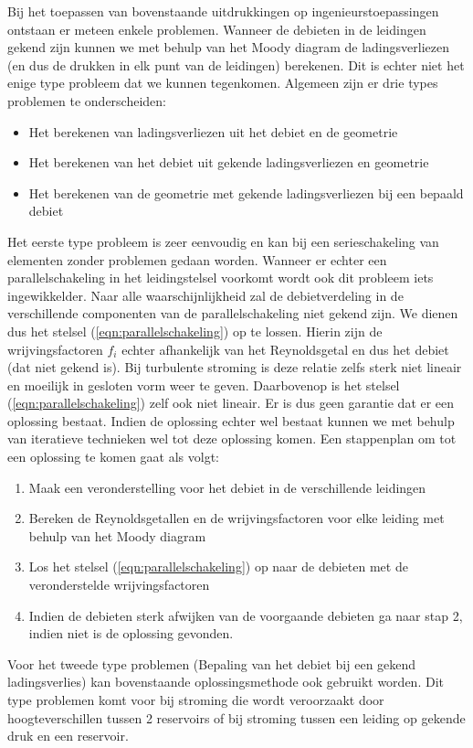 Bij het toepassen van bovenstaande uitdrukkingen op ingenieurstoepassingen ontstaan er meteen enkele problemen. Wanneer de debieten in de leidingen gekend zijn kunnen we met behulp van het Moody diagram de ladingsverliezen (en dus de drukken in elk punt van de leidingen) berekenen. Dit is echter niet het enige type probleem dat we kunnen tegenkomen. Algemeen zijn er drie types problemen te onderscheiden:
\begin{itemize}
	\item Het berekenen van ladingsverliezen uit het debiet en de geometrie
	\item Het berekenen van het debiet uit gekende ladingsverliezen en geometrie
	\item Het berekenen van de geometrie met gekende ladingsverliezen bij een bepaald debiet
\end{itemize}
Het eerste type probleem is zeer eenvoudig en kan bij een serieschakeling van elementen zonder problemen gedaan worden. Wanneer er echter een parallelschakeling in het leidingstelsel voorkomt wordt ook dit probleem iets ingewikkelder. Naar alle waarschijnlijkheid zal de debietverdeling in de verschillende componenten van de parallelschakeling niet gekend zijn. We dienen dus het stelsel (\ref{eqn:parallelschakeling}) op te lossen. Hierin zijn de wrijvingsfactoren $f_i$ echter afhankelijk van het Reynoldsgetal en dus het debiet (dat niet gekend is). Bij turbulente stroming is deze relatie zelfs sterk niet lineair en moeilijk in gesloten vorm weer te geven. Daarbovenop is het stelsel (\ref{eqn:parallelschakeling}) zelf ook niet lineair. Er is dus geen garantie dat er een oplossing bestaat.
Indien de oplossing echter wel bestaat kunnen we met behulp van iteratieve technieken wel tot deze oplossing komen. Een stappenplan om tot een oplossing te komen gaat als volgt:
\begin{enumerate}
	\item Maak een veronderstelling voor het debiet in de verschillende leidingen
	\item Bereken de Reynoldsgetallen en de wrijvingsfactoren voor elke leiding met behulp van het Moody diagram
	\item Los het stelsel (\ref{eqn:parallelschakeling}) op naar de debieten met de veronderstelde wrijvingsfactoren
	\item Indien de debieten sterk afwijken van de voorgaande debieten ga naar stap 2, indien niet is de oplossing gevonden.
\end{enumerate}

Voor het tweede type problemen (Bepaling van het debiet bij een gekend ladingsverlies) kan bovenstaande oplossingsmethode ook gebruikt worden. Dit type problemen komt voor bij stroming die wordt veroorzaakt door hoogteverschillen tussen 2 reservoirs of bij stroming tussen een leiding op gekende druk en een reservoir. 

